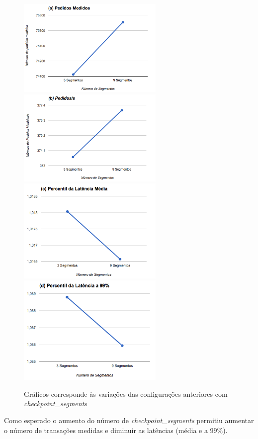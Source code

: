 \begin{figure}[ht!]
\centering
\includegraphics[width=70mm]{img/questao_3/sb_ecs_cs_a.png}
\includegraphics[width=70mm]{img/questao_3/sb_ecs_cs_b.png}
\includegraphics[width=70mm]{img/questao_3/sb_ecs_cs_c.png}
\includegraphics[width=70mm]{img/questao_3/sb_ecs_cs_d.png}
\caption{Gráficos corresponde às variações das configurações anteriores com \textit{checkpoint\_segments}}
\end{figure}

Como esperado o aumento do número de \textit{checkpoint\_segments} permitiu aumentar o número de transações medidas e diminuir as latências (média e a 99\%).

